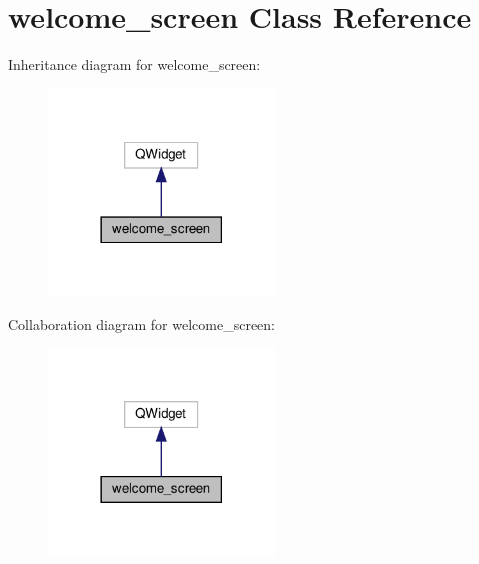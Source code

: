 \hypertarget{classwelcome__screen}{}\section{welcome\+\_\+screen Class Reference}
\label{classwelcome__screen}


Inheritance diagram for welcome\+\_\+screen\+:\nopagebreak
\begin{figure}[H]
\begin{center}
\leavevmode
\includegraphics[width=170pt]{classwelcome__screen__inherit__graph}
\end{center}
\end{figure}


Collaboration diagram for welcome\+\_\+screen\+:\nopagebreak
\begin{figure}[H]
\begin{center}
\leavevmode
\includegraphics[width=170pt]{classwelcome__screen__coll__graph}
\end{center}
\end{figure}
